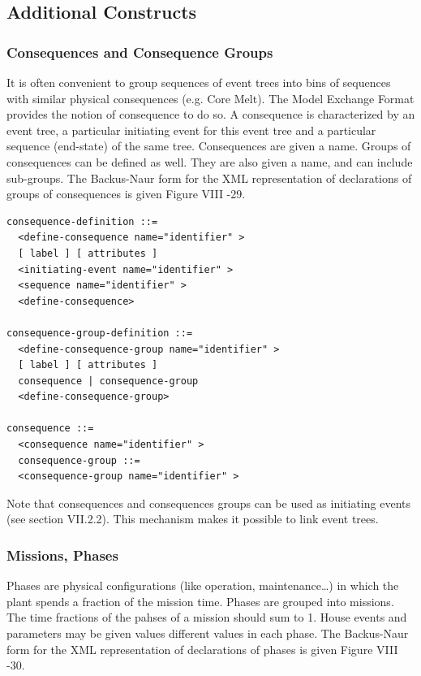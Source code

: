 \documentclass[11pt]{article}
\begin{document}
\subsection{Additional Constructs}
\label{sec:orgbd600f6}


\subsubsection{Consequences and Consequence Groups}
\label{sec:org6079820}

It is often convenient to group sequences of event trees into bins of
sequences with similar physical consequences (e.g. Core Melt). The Model
Exchange Format provides the notion of consequence to do so. A
consequence is characterized by an event tree, a particular initiating
event for this event tree and a particular sequence (end-state) of the
same tree. Consequences are given a name. Groups of consequences can be
defined as well. They are also given a name, and can include sub-groups.
The Backus-Naur form for the XML representation of declarations of
groups of consequences is given Figure VIII -29.



\begin{lstlisting}
consequence-definition ::=
  <define-consequence name="identifier" >
  [ label ] [ attributes ]
  <initiating-event name="identifier" >
  <sequence name="identifier" >
  <define-consequence>

consequence-group-definition ::=
  <define-consequence-group name="identifier" >
  [ label ] [ attributes ]
  consequence | consequence-group
  <define-consequence-group>

consequence ::=
  <consequence name="identifier" >
  consequence-group ::=
  <consequence-group name="identifier" >
\end{lstlisting}


Note that consequences and consequences groups can be used as initiating
events (see section VII.2.2). This mechanism makes it possible to link
event trees.

\subsubsection{Missions, Phases}
\label{sec:org777afef}

Phases are physical configurations (like operation, maintenance\ldots{}) in
which the plant spends a fraction of the mission time. Phases are
grouped into missions. The time fractions of the pahses of a mission
should sum to 1. House events and parameters may be given values
different values in each phase. The Backus-Naur form for the XML
representation of declarations of phases is given Figure VIII -30.
\end{document}
